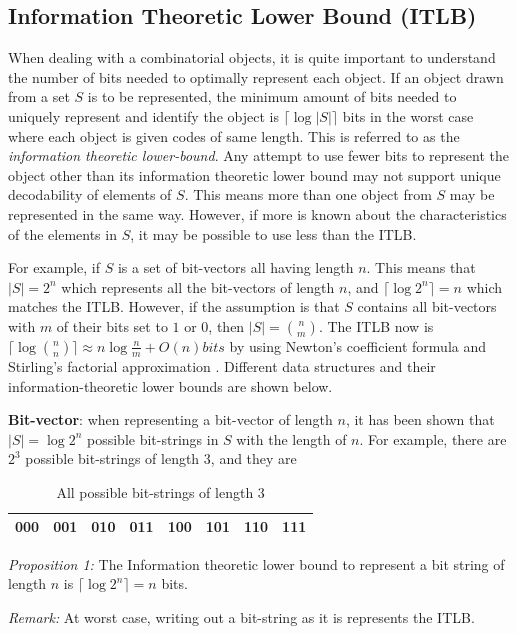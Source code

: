 \subsection{Information Theoretic Lower Bound (ITLB)}
\label{subsec:itlb}
When dealing with a combinatorial objects, it is quite important to understand the number of bits needed to optimally represent each object. If an object drawn from a set $S$ is to be represented, the minimum amount of bits needed to uniquely represent and identify the object is $\lceil \log|S| \rceil$ bits in the worst case where each object is given codes of same length. This is referred to as the \textit{information theoretic lower-bound}. Any attempt to use fewer bits to represent the object other than its information theoretic lower bound may not support unique decodability of elements of $S$. This means more than one object from $S$ may be represented in the same way. However, if more is known about the characteristics of the elements in $S$, it may be possible to use less than the ITLB.\par
For example, if $S$ is a set of bit-vectors all having length $n$. This means that $|S| = 2^n$ which represents all the bit-vectors of length $n$, and $\lceil \log {2^n} \rceil = n$ which matches the ITLB. However, if the assumption is that $S$ contains all bit-vectors with $m$ of their bits set to $1$ or $0$, then $|S|=\binom{n}{m}$. The ITLB now is $\lceil \log \binom{n}{n} \rceil \approx n \log \frac{n}{m} + O(n) bits$ by using Newton's coefficient formula and Stirling's factorial approximation \cite{Shannon_1948}. Different data structures and their information-theoretic lower bounds are shown below.\par
\textbf{Bit-vector}: when representing a bit-vector of length $n$, it has been shown that $|S| = \log 2^n$ possible bit-strings in $S$ with the length of $n$. For example, there are $2^3$ possible bit-strings of length $3$, and they are\newline
\begin{table}[H]
    \centering
    \begin{tabular}{|c|c|c|c|c|c|c|c|}\hline
        000&001&010&011&100&101&110&111\\ \hline
    \end{tabular}
    \caption{All possible bit-strings of length $3$}
    \label{tab:bit-strings-length3}
\end{table}

\textit{Proposition 1:} The Information theoretic lower bound to represent a bit string of length $n$ is $\lceil \log 2^n \rceil = n$ bits.\par
\textit{Remark:} At worst case, writing out a bit-string as it is represents the ITLB.\newline

